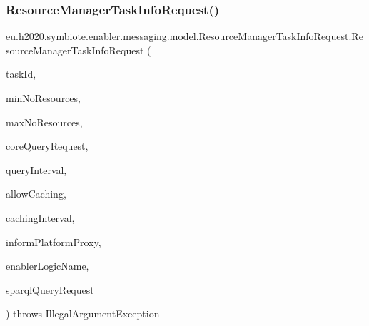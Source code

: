 \subsubsection{\texorpdfstring{Resource\+Manager\+Task\+Info\+Request()}{ResourceManagerTaskInfoRequest()}\hspace{0.1cm}{\footnotesize\ttfamily [2/2]}}
{\footnotesize\ttfamily eu.\+h2020.\+symbiote.\+enabler.\+messaging.\+model.\+Resource\+Manager\+Task\+Info\+Request.\+Resource\+Manager\+Task\+Info\+Request (\begin{DoxyParamCaption}\item[{@Json\+Property(\char`\"{}task\+Id\char`\"{}) String}]{task\+Id,  }\item[{@Json\+Property(\char`\"{}min\+No\+Resources\char`\"{}) Integer}]{min\+No\+Resources,  }\item[{@Json\+Property(\char`\"{}max\+No\+Resources\char`\"{}) Integer}]{max\+No\+Resources,  }\item[{@Json\+Property(\char`\"{}core\+Query\+Request\char`\"{}) Core\+Query\+Request}]{core\+Query\+Request,  }\item[{@Json\+Property(\char`\"{}query\+Interval\char`\"{}) String}]{query\+Interval,  }\item[{@Json\+Property(\char`\"{}allow\+Caching\char`\"{}) Boolean}]{allow\+Caching,  }\item[{@Json\+Property(\char`\"{}caching\+Interval\char`\"{}) String}]{caching\+Interval,  }\item[{@Json\+Property(\char`\"{}inform\+Platform\+Proxy\char`\"{}) Boolean}]{inform\+Platform\+Proxy,  }\item[{@Json\+Property(\char`\"{}enabler\+Logic\+Name\char`\"{}) String}]{enabler\+Logic\+Name,  }\item[{@Json\+Property(\char`\"{}sparql\+Query\+Request\char`\"{}) Sparql\+Query\+Request}]{sparql\+Query\+Request }\end{DoxyParamCaption}) throws Illegal\+Argument\+Exception}


